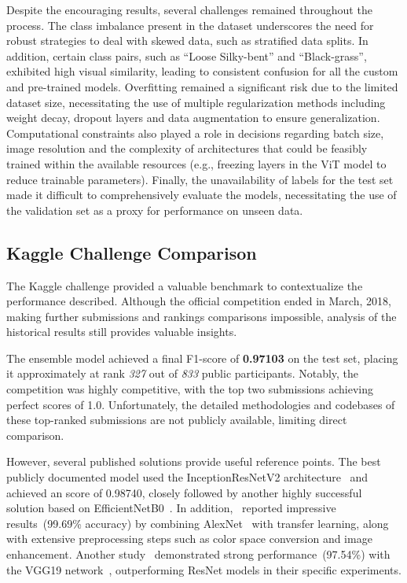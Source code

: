 Despite the encouraging results, several challenges remained throughout the process. The class imbalance present in the dataset underscores the need for robust strategies to deal with skewed data, such as stratified data splits. In addition, certain class pairs, such as ``Loose Silky-bent'' and ``Black-grass'', exhibited high visual similarity, leading to consistent confusion for all the custom and pre-trained models. Overfitting remained a significant risk due to the limited dataset size, necessitating the use of multiple regularization methods including weight decay, dropout layers and data augmentation to ensure generalization. Computational constraints also played a role in decisions regarding batch size, image resolution and the complexity of architectures that could be feasibly trained within the available resources (e.g., freezing layers in the ViT model to reduce trainable parameters). Finally, the unavailability of labels for the test set made it difficult to comprehensively evaluate the models, necessitating the use of the validation set as a proxy for performance on unseen data.

\subsection{Kaggle Challenge Comparison}

The Kaggle challenge provided a valuable benchmark to contextualize the performance described. Although the official competition ended in March, 2018, making further submissions and rankings comparisons impossible, analysis of the historical results still provides valuable insights.

The ensemble model achieved a final F1-score of \textbf{0.97103} on the test set, placing it approximately at rank \textit{327} out of \textit{833} public participants. Notably, the competition was highly competitive, with the top two submissions achieving perfect scores of 1.0. Unfortunately, the detailed methodologies and codebases of these top-ranked submissions are not publicly available, limiting direct comparison.

However, several published solutions provide useful reference points. The best publicly documented model used the InceptionResNetV2 architecture~\cite{DBLP:journals/corr/SzegedyIV16} and achieved an score of 0.98740, closely followed by another highly successful solution based on EfficientNetB0~\cite{DBLP:journals/corr/abs-1905-11946}. In addition,~\cite{8650178} reported impressive results~(99.69\% accuracy) by combining AlexNet~\cite{NIPS2012_c399862d} with transfer learning, along with extensive preprocessing steps such as color space conversion and image enhancement. Another study~\cite{hassan2021plant} demonstrated strong performance~(97.54\%) with the VGG19 network~\cite{simonyan2015deepconvolutionalnetworkslargescale}, outperforming ResNet models in their specific experiments.

